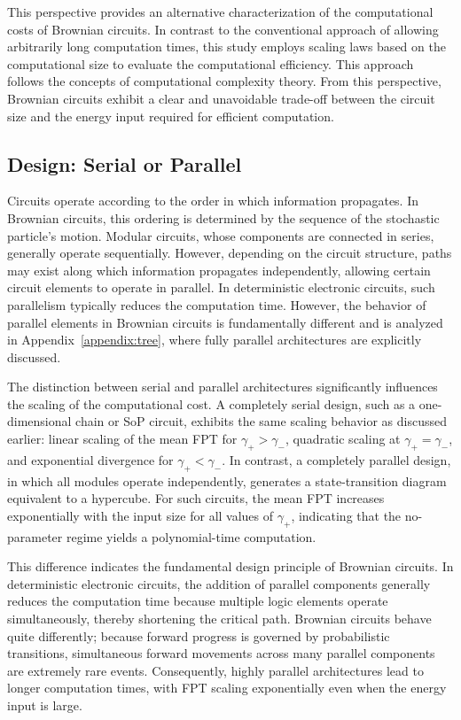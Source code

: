 \documentclass[%
 reprint,
superscriptaddress,
 amsmath,amssymb,
 aps,
 prx,
]{revtex4-2}
\begin{document}
This perspective provides an alternative characterization of the computational costs of Brownian circuits. In contrast to the conventional approach of allowing arbitrarily long computation times, this study employs scaling laws based on the computational size to evaluate the computational efficiency. This approach follows the concepts of computational complexity theory. From this perspective, Brownian circuits exhibit a clear and unavoidable trade-off between the circuit size and the energy input required for efficient computation. 

\subsection{Design: Serial or Parallel}
Circuits operate according to the order in which information propagates. In Brownian circuits, this ordering is determined by the sequence of the stochastic particle's motion. Modular circuits, whose components are connected in series, generally operate sequentially. However, depending on the circuit structure, paths may exist along which information propagates independently, allowing certain circuit elements to operate in parallel. In deterministic electronic circuits, such parallelism typically reduces the computation time. However, the behavior of parallel elements in Brownian circuits is fundamentally different and is analyzed in Appendix~\ref{appendix:tree}, where fully parallel architectures are explicitly discussed. 

The distinction between serial and parallel architectures significantly influences the scaling of the computational cost. 
A completely serial design, such as a one-dimensional chain or SoP circuit,  exhibits the same scaling behavior as discussed earlier: linear scaling of the mean FPT for $\gamma_+>\gamma_-$, quadratic scaling at $\gamma_+=\gamma_-$, and exponential divergence for $\gamma_+<\gamma_-$.  
In contrast, a completely parallel design, in which all modules operate independently, generates a state-transition diagram equivalent to a hypercube. For such circuits, the mean FPT increases exponentially with the input size for all values of $\gamma_+$, indicating that the no-parameter regime yields a polynomial-time computation. 

This difference indicates the fundamental design principle of Brownian circuits. 
In deterministic electronic circuits, the addition of parallel components generally reduces the computation time because multiple logic elements operate simultaneously, thereby shortening the critical path. Brownian circuits behave quite differently; because forward progress is governed by probabilistic transitions, simultaneous forward movements across many parallel components are extremely rare events. Consequently, highly parallel architectures lead to longer computation times, with FPT scaling exponentially even when the energy input is large.  
\end{document}

